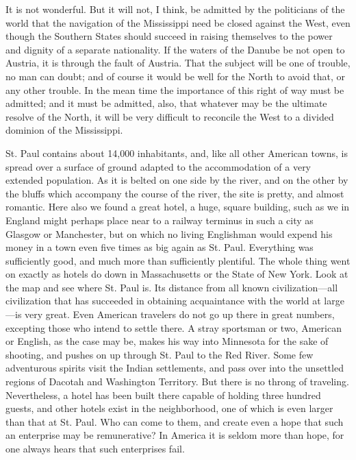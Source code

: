 It is not wonderful.  But it will not, I think, be admitted by the
politicians of the world that the navigation of the Mississippi
need be closed against the West, even though the Southern States
should succeed in raising themselves to the power and dignity of a
separate nationality.  If the waters of the Danube be not open to
Austria, it is through the fault of Austria.  That the subject will
be one of trouble, no man can doubt; and of course it would be well
for the North to avoid that, or any other trouble.  In the mean
time the importance of this right of way must be admitted; and it
must be admitted, also, that whatever may be the ultimate resolve
of the North, it will be very difficult to reconcile the West to a
divided dominion of the Mississippi.

St. Paul contains about 14,000 inhabitants, and, like all other
American towns, is spread over a surface of ground adapted to the
accommodation of a very extended population.  As it is belted on
one side by the river, and on the other by the bluffs which
accompany the course of the river, the site is pretty, and almost
romantic.  Here also we found a great hotel, a huge, square
building, such as we in England might perhaps place near to a
railway terminus in such a city as Glasgow or Manchester, but on
which no living Englishman would expend his money in a town even
five times as big again as St. Paul.  Everything was sufficiently
good, and much more than sufficiently plentiful.  The whole thing
went on exactly as hotels do down in Massachusetts or the State of
New York.  Look at the map and see where St. Paul is.  Its distance
from all known civilization---all civilization that has succeeded in
obtaining acquaintance with the world at large---is very great.
Even American travelers do not go up there in great numbers,
excepting those who intend to settle there.  A stray sportsman or
two, American or English, as the case may be, makes his way into
Minnesota for the sake of shooting, and pushes on up through St.
Paul to the Red River.  Some few adventurous spirits visit the
Indian settlements, and pass over into the unsettled regions of
Dacotah and Washington Territory.  But there is no throng of
traveling.  Nevertheless, a hotel has been built there capable of
holding three hundred guests, and other hotels exist in the
neighborhood, one of which is even larger than that at St. Paul.
Who can come to them, and create even a hope that such an
enterprise may be remunerative?  In America it is seldom more than
hope, for one always hears that such enterprises fail.

